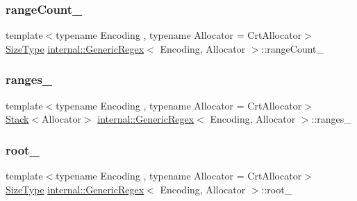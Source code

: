 \mbox{\label{classinternal_1_1GenericRegex_ad65c6144b7dc5b0441ef20dc4ef81619}} 
\subsubsection{\texorpdfstring{range\+Count\+\_\+}{rangeCount\_}}
{\footnotesize\ttfamily template$<$typename Encoding , typename Allocator  = Crt\+Allocator$>$ \\
\hyperlink{rapidjson_8h_a5ed6e6e67250fadbd041127e6386dcb5}{Size\+Type} \hyperlink{classinternal_1_1GenericRegex}{internal\+::\+Generic\+Regex}$<$ Encoding, Allocator $>$\+::range\+Count\+\_\+\hspace{0.3cm}{\ttfamily [private]}}

\mbox{\label{classinternal_1_1GenericRegex_af94c64023502147345303d70ff594140}} 
\subsubsection{\texorpdfstring{ranges\+\_\+}{ranges\_}}
{\footnotesize\ttfamily template$<$typename Encoding , typename Allocator  = Crt\+Allocator$>$ \\
\hyperlink{classinternal_1_1Stack}{Stack}$<$Allocator$>$ \hyperlink{classinternal_1_1GenericRegex}{internal\+::\+Generic\+Regex}$<$ Encoding, Allocator $>$\+::ranges\+\_\+\hspace{0.3cm}{\ttfamily [private]}}

\mbox{\label{classinternal_1_1GenericRegex_a2af8c29234a2229b509fdf60cf265201}} 
\subsubsection{\texorpdfstring{root\+\_\+}{root\_}}
{\footnotesize\ttfamily template$<$typename Encoding , typename Allocator  = Crt\+Allocator$>$ \\
\hyperlink{rapidjson_8h_a5ed6e6e67250fadbd041127e6386dcb5}{Size\+Type} \hyperlink{classinternal_1_1GenericRegex}{internal\+::\+Generic\+Regex}$<$ Encoding, Allocator $>$\+::root\+\_\+\hspace{0.3cm}{\ttfamily [private]}}

